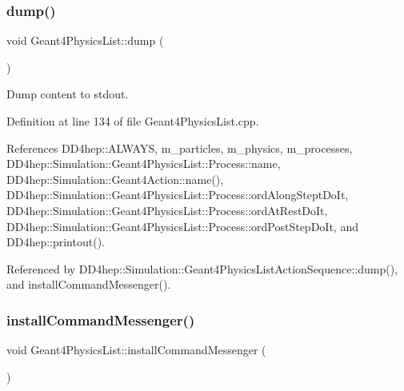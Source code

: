 \subsubsection{\texorpdfstring{dump()}{dump()}}
{\footnotesize\ttfamily void Geant4\+Physics\+List\+::dump (\begin{DoxyParamCaption}{ }\end{DoxyParamCaption})}



Dump content to stdout. 



Definition at line 134 of file Geant4\+Physics\+List.\+cpp.



References D\+D4hep\+::\+A\+L\+W\+A\+YS, m\+\_\+particles, m\+\_\+physics, m\+\_\+processes, D\+D4hep\+::\+Simulation\+::\+Geant4\+Physics\+List\+::\+Process\+::name, D\+D4hep\+::\+Simulation\+::\+Geant4\+Action\+::name(), D\+D4hep\+::\+Simulation\+::\+Geant4\+Physics\+List\+::\+Process\+::ord\+Along\+Stept\+Do\+It, D\+D4hep\+::\+Simulation\+::\+Geant4\+Physics\+List\+::\+Process\+::ord\+At\+Rest\+Do\+It, D\+D4hep\+::\+Simulation\+::\+Geant4\+Physics\+List\+::\+Process\+::ord\+Post\+Step\+Do\+It, and D\+D4hep\+::printout().



Referenced by D\+D4hep\+::\+Simulation\+::\+Geant4\+Physics\+List\+Action\+Sequence\+::dump(), and install\+Command\+Messenger().

\hypertarget{class_d_d4hep_1_1_simulation_1_1_geant4_physics_list_af18b7d6454f56d0aa6e55a2046cff019}{}\label{class_d_d4hep_1_1_simulation_1_1_geant4_physics_list_af18b7d6454f56d0aa6e55a2046cff019} 
\subsubsection{\texorpdfstring{install\+Command\+Messenger()}{installCommandMessenger()}}
{\footnotesize\ttfamily void Geant4\+Physics\+List\+::install\+Command\+Messenger (\begin{DoxyParamCaption}{ }\end{DoxyParamCaption})\hspace{0.3cm}{\ttfamily [virtual]}}



